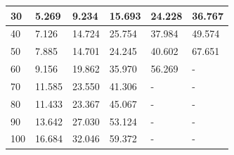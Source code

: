 \begin{table}[H]
\begin{tabular}{|l|l|l|l|l|l|}
30                               & 5.269           & 9.234            & 15.693           & 24.228           & 36.767           \\ \hline
40                               & 7.126           & 14.724           & 25.754           & 37.984           & 49.574           \\ \hline
50                               & 7.885           & 14.701           & 24.245           & 40.602           & 67.651           \\ \hline
60                               & 9.156           & 19.862           & 35.970           & 56.269           & -                \\ \hline
70                               & 11.585          & 23.550           & 41.306           & -                & -                \\ \hline
80                               & 11.433          & 23.367           & 45.067           & -                & -                \\ \hline
90                               & 13.642          & 27.030           & 53.124           & -                & -                \\ \hline
100                              & 16.684          & 32.046           & 59.372           & -                & -                \\ \hline
\end{tabular}
\end{table}

